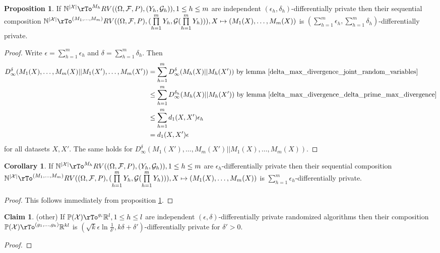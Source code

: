 \documentclass[12pt]{amsart}
\theoremstyle{definition}
\newtheorem{claim}[theorem]{Claim}
\newtheorem{corollary}[theorem]{Corollary}
\newtheorem{proposition}[theorem]{Proposition}
\begin{document}
\begin{proposition} \label{sequential_composition_epsilon_delta} If $\mathbb{N}^{|\mathcal{X}|} \rTo^{M_h} RV((\Omega, \mathcal{F}, P), (Y_h, \mathcal{G}_h)), 1 \leq h \leq m$ are independent $(\epsilon_h, \delta_h)$-differentially private then their sequential composition \newline
$\mathbb{N}^{|\mathcal{X}|} \rTo^{(M_1, \dots , M_m)} RV((\Omega, \mathcal{F}, P), (\prod\limits_{h = 1}^m Y_h, \mathcal{G}(\prod\limits_{h = 1}^m Y_h))), X \mapsto (M_1(X), \dots , M_m(X))$ is $(\sum\limits_{h = 1}^m \epsilon_h, \sum\limits_{h = 1}^m \delta_h)$-differentially private.
\end{proposition}
\begin{proof} Write $\epsilon = \sum\limits_{h = 1}^m \epsilon_h$ and $\delta = \sum\limits_{h = 1}^m \delta_h$. Then
\begin{align*}
D_{\infty}^{\delta} (M_1(X), \dots, M_m(X) || M_1(X'), \dots , M_m(X')) & = \sum_{h = 1}^m D_{\infty}^{\delta} (M_h(X) || M_h(X')) \text{ by lemma \ref{delta_max_divergence_joint_random_variables}} \\
 & \leq \sum_{h = 1}^m D_{\infty}^{\delta_h} (M_h(X) || M_h(X')) \text{ by lemma \ref{delta_max_divergence_delta_prime_max_divergence}} \\
 & \leq \sum_{h = 1}^m d_1(X, X') \epsilon_h \\
 & = d_1(X, X') \epsilon \\
\end{align*}
for all datasets $X, X'$. The same holds for $D_{\infty}^{\delta} (M_1(X'), \dots, M_m(X') || M_1(X), \dots , M_m(X))$.
\end{proof}

\begin{corollary} \label{sequential_composition_epsilon} If $\mathbb{N}^{|\mathcal{X}|} \rTo^{M_h} RV((\Omega, \mathcal{F}, P), (Y_h, \mathcal{G}_h)), 1 \leq h \leq m$ are $\epsilon_h$-differentially private then their sequential composition $\mathbb{N}^{|\mathcal{X}|} \rTo^{(M_1, \dots , M_m)} RV((\Omega, \mathcal{F}, P),(\prod\limits_{h = 1}^m Y_h, \mathcal{G}(\prod\limits_{h = 1}^m Y_h))), X \mapsto (M_1(X), \dots , M_m(X))$ is $\sum\limits_{h = 1}^m \epsilon_h$-differentially private.
\end{corollary}
\begin{proof} This follows immediately from proposition \ref{sequential_composition_epsilon_delta}.
\end{proof}

\begin{claim} (other) If $\mathbb{P}(\mathbb{\mathcal{X}}) \rTo^{g_i} \mathbb{R}^l, 1 \leq h \leq l$ are independent $(\epsilon, \delta)$-differentially private randomized algorithms then their composition $\mathbb{P}(\mathbb{\mathcal{X}}) \rTo^{(g_1, \dots, g_k)} \mathbb{R}^{kl}$ is $(\sqrt{k} \epsilon \ln \frac{1}{\delta '}, k \delta + \delta')$-differentially private for $\delta' > 0$.
\end{claim}
\begin{proof}
\end{proof}
\end{document}
